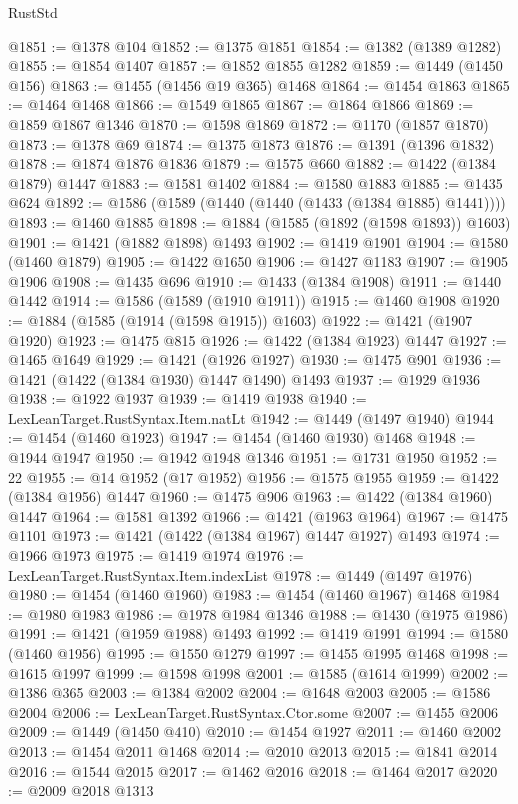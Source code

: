 \begin{lexlean}{RustStd}
\begin{coremodule}
@1851 := @1378 @104
@1852 := @1375 @1851
@1854 := @1382 (@1389 @1282)
@1855 := @1854 @1407
@1857 := @1852 @1855 @1282
@1859 := @1449 (@1450 @156)
@1863 := @1455 (@1456 @19 @365) @1468
@1864 := @1454 @1863
@1865 := @1464 @1468
@1866 := @1549 @1865
@1867 := @1864 @1866
@1869 := @1859 @1867 @1346
@1870 := @1598 @1869
@1872 := @1170 (@1857 @1870)
@1873 := @1378 @69
@1874 := @1375 @1873
@1876 := @1391 (@1396 @1832)
@1878 := @1874 @1876 @1836
@1879 := @1575 @660
@1882 := @1422 (@1384 @1879) @1447
@1883 := @1581 @1402
@1884 := @1580 @1883
@1885 := @1435 @624
@1892 := @1586 (@1589 (@1440 (@1440 (@1433 (@1384 @1885) @1441))))
@1893 := @1460 @1885
@1898 := @1884 (@1585 (@1892 (@1598 @1893)) @1603)
@1901 := @1421 (@1882 @1898) @1493
@1902 := @1419 @1901
@1904 := @1580 (@1460 @1879)
@1905 := @1422 @1650
@1906 := @1427 @1183
@1907 := @1905 @1906
@1908 := @1435 @696
@1910 := @1433 (@1384 @1908)
@1911 := @1440 @1442
@1914 := @1586 (@1589 (@1910 @1911))
@1915 := @1460 @1908
@1920 := @1884 (@1585 (@1914 (@1598 @1915)) @1603)
@1922 := @1421 (@1907 @1920)
@1923 := @1475 @815
@1926 := @1422 (@1384 @1923) @1447
@1927 := @1465 @1649
@1929 := @1421 (@1926 @1927)
@1930 := @1475 @901
@1936 := @1421 (@1422 (@1384 @1930) @1447 @1490) @1493
@1937 := @1929 @1936
@1938 := @1922 @1937
@1939 := @1419 @1938
@1940 := LexLeanTarget.RustSyntax.Item.natLt
@1942 := @1449 (@1497 @1940)
@1944 := @1454 (@1460 @1923)
@1947 := @1454 (@1460 @1930) @1468
@1948 := @1944 @1947
@1950 := @1942 @1948 @1346
@1951 := @1731 @1950
@1952 := 22
@1955 := @14 @1952 (@17 @1952)
@1956 := @1575 @1955
@1959 := @1422 (@1384 @1956) @1447
@1960 := @1475 @906
@1963 := @1422 (@1384 @1960) @1447
@1964 := @1581 @1392
@1966 := @1421 (@1963 @1964)
@1967 := @1475 @1101
@1973 := @1421 (@1422 (@1384 @1967) @1447 @1927) @1493
@1974 := @1966 @1973
@1975 := @1419 @1974
@1976 := LexLeanTarget.RustSyntax.Item.indexList
@1978 := @1449 (@1497 @1976)
@1980 := @1454 (@1460 @1960)
@1983 := @1454 (@1460 @1967) @1468
@1984 := @1980 @1983
@1986 := @1978 @1984 @1346
@1988 := @1430 (@1975 @1986)
@1991 := @1421 (@1959 @1988) @1493
@1992 := @1419 @1991
@1994 := @1580 (@1460 @1956)
@1995 := @1550 @1279
@1997 := @1455 @1995 @1468
@1998 := @1615 @1997
@1999 := @1598 @1998
@2001 := @1585 (@1614 @1999)
@2002 := @1386 @365
@2003 := @1384 @2002
@2004 := @1648 @2003
@2005 := @1586 @2004
@2006 := LexLeanTarget.RustSyntax.Ctor.some
@2007 := @1455 @2006
@2009 := @1449 (@1450 @410)
@2010 := @1454 @1927
@2011 := @1460 @2002
@2013 := @1454 @2011 @1468
@2014 := @2010 @2013
@2015 := @1841 @2014
@2016 := @1544 @2015
@2017 := @1462 @2016
@2018 := @1464 @2017
@2020 := @2009 @2018 @1313

\end{coremodule}
\end{lexlean}
